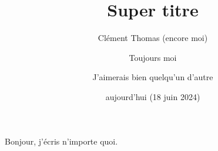 \documentclass[a4paper, 11pt]{article}
\begin{document}
\title{Super titre}
\author{Clément Thomas (encore moi)
	\and
	Toujours moi
	\and
	J'aimerais bien quelqu'un d'autre
} %
\date{aujourd'hui (18 juin 2024)}

\maketitle
\tableofcontents

Bonjour, j'écris n'importe quoi.
\end{document}
